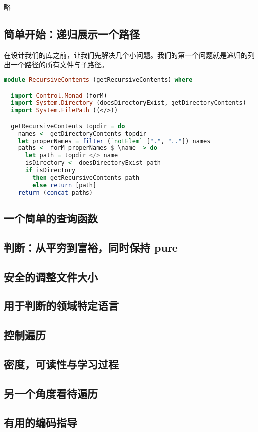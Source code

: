 \documentclass[./main.tex]{subfiles}
\begin{document}
略

\subsection*{简单开始：递归展示一个路径}

在设计我们的库之前，让我们先解决几个小问题。我们的第一个问题就是递归的列出一个路径的所有文件与子路径。

\begin{lstlisting}[language=Haskell]
  module RecursiveContents (getRecursiveContents) where

  import Control.Monad (forM)
  import System.Directory (doesDirectoryExist, getDirectoryContents)
  import System.FilePath ((</>))

  getRecursiveContents topdir = do
    names <- getDirectoryContents topdir
    let properNames = filter (`notElem` [".", ".."]) names
    paths <- forM properNames $ \name -> do
      let path = topdir </> name
      isDirectory <- doesDirectoryExist path
      if isDirectory
        then getRecursiveContents path
        else return [path]
    return (concat paths)
\end{lstlisting}


\subsection*{一个简单的查询函数}

\subsection*{判断：从平穷到富裕，同时保持 pure}

\subsection*{安全的调整文件大小}

\subsection*{用于判断的领域特定语言}

\subsection*{控制遍历}

\subsection*{密度，可读性与学习过程}

\subsection*{另一个角度看待遍历}

\subsection*{有用的编码指导}
\end{document}
